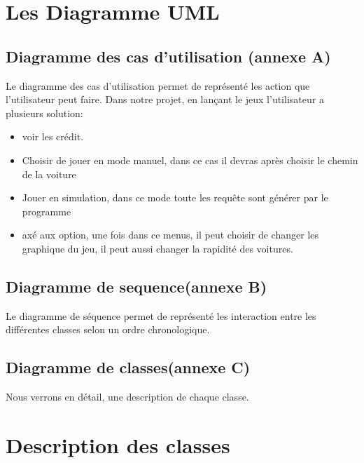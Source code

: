 \documentclass[a4paper, titlepage]{report}
\begin{document}
\chapter{Les Diagramme UML}
\section{Diagramme des cas d'utilisation (annexe A)}
\hspace{0.5cm} Le diagramme des cas d'utilisation permet de représenté les action que l'utilisateur peut faire. Dans notre projet, en lançant le jeux l'utilisateur a plusieurs solution:
\begin{itemize}
\item voir les crédit.
\item Choisir de jouer en mode manuel, dans ce cas il devras après choisir le chemin de la voiture
\item Jouer en simulation, dans ce mode toute les requête sont générer par le programme
\item axé aux option, une fois dans ce menus, il peut choisir de changer les graphique du jeu, il peut aussi changer la rapidité des voitures.
\end{itemize}
\section{Diagramme de sequence(annexe B)}
\hspace{0.5cm} Le diagramme de séquence permet de représenté les interaction entre les différentes classes selon un ordre chronologique.
\section{Diagramme de classes(annexe C)}
\hspace{0.5cm} Nous verrons en détail, une description de chaque classe.
\chapter{Description des classes}
\end{document}
